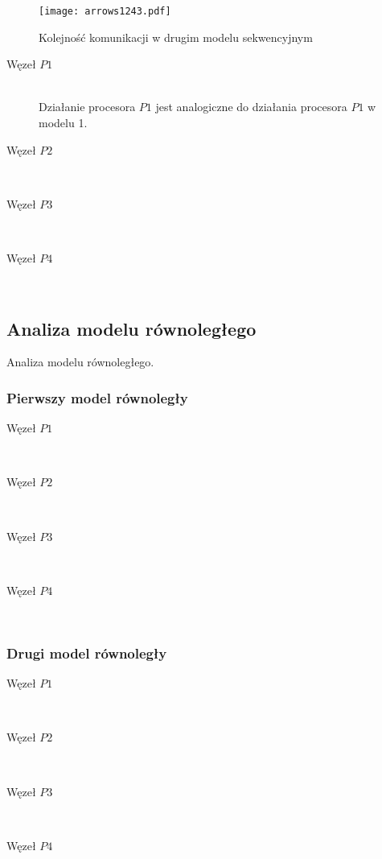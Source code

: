 \begin{figure}[!ht]
\centering
\texttt{[image: arrows1243.pdf]}
\caption{Kolejność komunikacji w drugim modelu sekwencyjnym}
\label{fig:seq3}
\end{figure}

\begin{description}

\item[Węzeł $P1$] \hfill \\

Działanie procesora $P1$ jest analogiczne do działania procesora $P1$ w modelu 1.

\item[Węzeł $P2$] \hfill \\

\item[Węzeł $P3$] \hfill \\

\item[Węzeł $P4$] \hfill \\

\end{description}

\subsection{Analiza modelu równoległego}

Analiza modelu równoległego.


\subsubsection{Pierwszy model równoległy}

\begin{description}

\item[Węzeł $P1$] \hfill \\

\item[Węzeł $P2$] \hfill \\

\item[Węzeł $P3$] \hfill \\

\item[Węzeł $P4$] \hfill \\

\end{description}

\subsubsection{Drugi model równoległy}

\begin{description}

\item[Węzeł $P1$] \hfill \\

\item[Węzeł $P2$] \hfill \\

\item[Węzeł $P3$] \hfill \\

\item[Węzeł $P4$] \hfill \\

\end{description}
